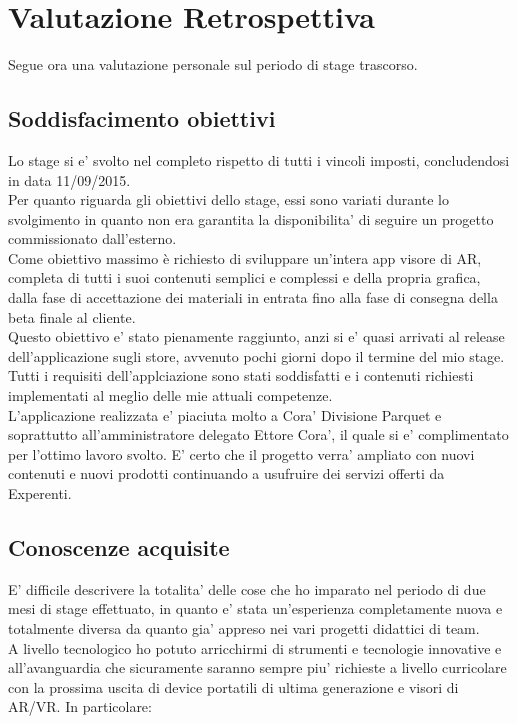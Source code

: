 \section{Valutazione Retrospettiva}
Segue ora una valutazione personale sul periodo di stage trascorso.
\subsection{Soddisfacimento obiettivi}
Lo stage si e' svolto nel completo rispetto di tutti i vincoli imposti, concludendosi in data 11/09/2015. \\
Per quanto riguarda gli obiettivi dello stage, essi sono variati durante lo svolgimento in quanto non era garantita la disponibilita' di seguire un progetto commissionato dall'esterno.\\
Come obiettivo massimo è richiesto di sviluppare un’intera app visore di AR, completa di tutti i suoi contenuti semplici e complessi e della propria grafica, dalla fase di accettazione dei materiali in entrata fino alla fase di consegna della beta finale al cliente.\\
Questo obiettivo e' stato pienamente raggiunto, anzi si e' quasi arrivati al release dell'applicazione sugli store, avvenuto pochi giorni dopo il termine del mio stage.\\
Tutti i requisiti dell'applciazione sono stati soddisfatti e i contenuti richiesti implementati al meglio delle mie attuali competenze.\\
L'applicazione realizzata e' piaciuta molto a Cora' Divisione Parquet e soprattutto all'amministratore delegato Ettore Cora', il quale si e' complimentato per l'ottimo lavoro svolto. E' certo che il progetto verra' ampliato con nuovi contenuti e nuovi prodotti continuando a usufruire dei servizi offerti da Experenti.\\
\subsection{Conoscenze acquisite}
E' difficile descrivere la totalita' delle cose che ho imparato nel periodo di due mesi di stage effettuato, in quanto e' stata un'esperienza completamente nuova e totalmente diversa da quanto gia' appreso nei vari progetti didattici di team.\\
A livello tecnologico ho potuto arricchirmi di strumenti e tecnologie innovative e all'avanguardia che sicuramente saranno sempre piu' richieste a livello curricolare con la prossima uscita di device portatili di ultima generazione e visori di AR/VR. In particolare:


